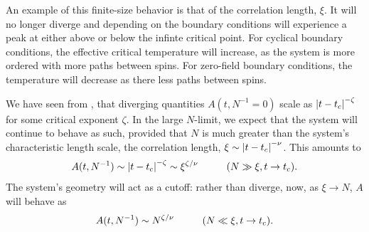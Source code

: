 An example of this finite-size behavior is that of the correlation
length, $\xi$. It will no longer diverge and depending on the boundary
conditions will experience a peak at either above or below the infinte
critical point. For cyclical boundary conditions, the effective
critical temperature will increase, as the system is more ordered with
more paths between spins. For zero-field boundary conditions, the
temperature will decrease as there less paths between spins.

We have seen from , that diverging quantities
$A(t,N^{-1}=0)$ scale as $\abs{t-t_c}^{-\zeta}$ for some critical
exponent $\zeta$. In the large $N$-limit, we expect that the system
will continue to behave as such, provided that $N$ is much greater
than the system's characteristic length scale, the correlation length,
$\xi\sim \abs{t-t_c}^{-\nu}$. This amounts to%
\begin{equation}%
  A(t, N^{-1})\sim \abs{t-t_c}^{-\zeta}\sim \xi^{\zeta/\nu}\tab (N \gg \xi, t\rightarrow t_c).
\end{equation}%
The system's geometry will act as a cutoff: rather than diverge, now,
as $\xi \rightarrow N$, $A$ will behave as%
\begin{equation}%
  A(t,N^{-1})\sim N^{\zeta/\nu}\tab (N \ll \xi, t\rightarrow t_c).
\end{equation}%

